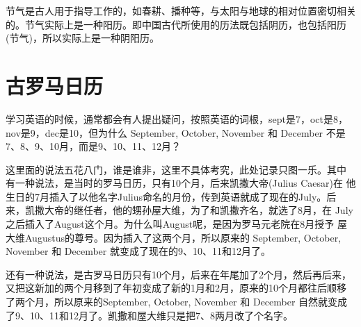 节气是古人用于指导工作的，如春耕、播种等，与太阳与地球的相对位置密切相关的。节气实际上是一种阳历。即中国古代所使用的历法既包括阴历，也包括阳历(节气)，所以实际上是一种阴阳历。



\section{古罗马日历}
\label{sec:Rome-calender}

学习英语的时候，通常都会有人提出疑问，按照英语的词根，sept是7，oct是8，
nov是9，dec是10，但为什么 September, October, November 和 December 不是
7、8、9、10月，而是9、10、11、12月？

这里面的说法五花八门，谁是谁非，这里不具体考究，此处记录只图一乐。其中
有一种说法，是当时的罗马日历，只有10个月，后来凯撒大帝(Julius Caesar)在
他生日的7月插入了以他名字Julius命名的月份，传到英语就成了现在的July。后
来，凯撒大帝的继任者，他的甥孙屋大维，为了和凯撒齐名，就选了8月，在
July之后插入了August这个月。为什么叫August呢，是因为罗马元老院在8月授予
屋大维Augustus的尊号。因为插入了这两个月，所以原来的 September,
October, November 和 December 就变成了现在的9、10、11和12月了。

还有一种说法，是古罗马日历只有10个月，后来在年尾加了2个月，然后再后来，
又把这新加的两个月移到了年初变成了新的1月和2月，原来的10个月都往后顺移
了两个月，所以原来的September, October, November 和 December 自然就变成
了9、10、11和12月了。凯撒和屋大维只是把7、8两月改了个名字。


